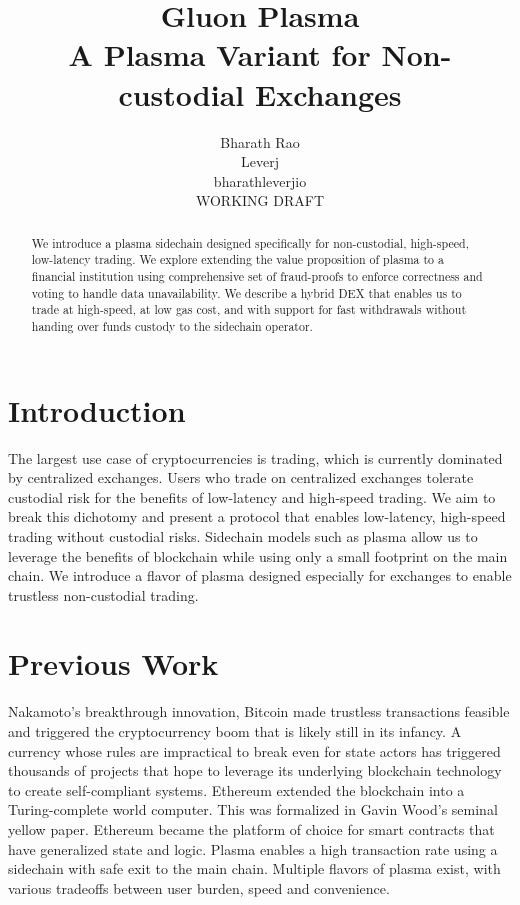 \documentclass[12pt,a4paper]{article}
\title{Gluon Plasma \\
\large A Plasma Variant for Non-custodial Exchanges}
\author{Bharath Rao \\ 
Leverj\\
bharath\svgat leverj\svgperiod io \\
\tiny WORKING DRAFT}
\begin{document}
\maketitle

\begin{abstract}

        We introduce a plasma sidechain designed specifically for non-custodial, high-speed, low-latency trading. We explore extending the value proposition of plasma to a financial institution using comprehensive set of fraud-proofs to enforce correctness and voting to handle data unavailability. We describe a hybrid DEX that enables us to trade at high-speed, at low gas cost, and with support for fast withdrawals without handing over funds custody to the sidechain operator. 
\end{abstract}
\section{Introduction}

The largest use case of cryptocurrencies is trading, which is currently dominated by centralized exchanges. Users who trade on centralized exchanges tolerate custodial risk for the benefits of low-latency and high-speed trading. We aim to break this dichotomy and present a protocol that enables low-latency, high-speed trading without custodial risks. 
Sidechain models such as plasma allow us to leverage the benefits of blockchain while using only a small footprint on the main chain. We introduce a flavor of plasma designed especially for exchanges to enable trustless non-custodial trading.

\section{Previous Work}

Nakamoto’s breakthrough innovation, Bitcoin\cite{Nak09} made trustless transactions feasible and triggered the cryptocurrency boom that is likely still in its infancy. A currency whose rules are impractical to break even for state actors has triggered thousands of projects that hope to leverage its underlying blockchain technology to create self-compliant systems. 
Ethereum\cite{Eth14} extended the blockchain into a Turing-complete world computer. This was formalized in Gavin Wood’s seminal yellow paper\cite{Gav15}. Ethereum became the platform of choice for smart contracts that have generalized state and logic. Plasma\cite{PB17} enables a high transaction rate using a sidechain with safe exit to the main chain. Multiple flavors of plasma exist, with various tradeoffs between user burden, speed and convenience.
\end{document}
